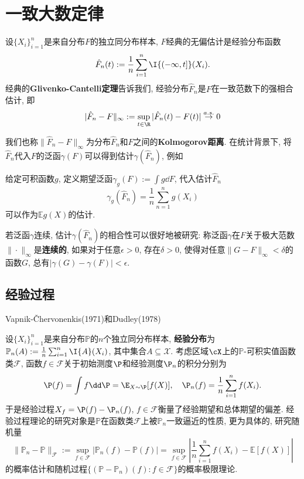 \section{一致大数定律}
 
设$\{X_i\}_{i=1}^n$是来自分布$F$的独立同分布样本, $F$经典的无偏估计是经验分布函数
\begin{equation*}
	\hat F_n(t) := \frac{1}{n} \sum_{i=1}^n \I{(-\infty, t]}(X_i). 
\end{equation*}
经典的\textbf{Glivenko-Cantelli定理}告诉我们, 经验分布$\hat F_n$是$F$在一致范数下的强相合估计, 即
\begin{equation*}
	|\hat F_n - F\|_{\infty} 
	:= \sup_{t \in \R} |\hat F_n(t) - F(t)| \stackrel{a.s.}{\to} 0
\end{equation*}

我们也称$\|\hat F_n - F\|_{\infty}$为分布$\hat F_n$和$F$之间的\textbf{Kolmogorov距离}. 
在统计背景下,  将$\hat F_n$代入$F$的泛函$\gamma(F)$可以得到估计$\gamma(\hat F_n)$, 例如

\begin{example}
	给定可积函数$g$, 定义期望泛函$\gamma_g(F) := \int g \dd F$, 代入估计$\hat F_n$
	\begin{equation*}
		\gamma_g(\hat F_n) = \frac{1}{n} \sum_{n=1}^n g(X_i)
	\end{equation*}
	可以作为$\mathbb{E} g(X)$的估计. 
\end{example}

若泛函$\gamma$连续, 估计$\gamma(\hat F_n)$的相合性可以很好地被研究: 称泛函$\gamma$在$F$关于极大范数$\| \cdot \|_{\infty}$是\textbf{连续的}, 如果对于任意$\epsilon > 0$, 存在$\delta > 0$, 使得对任意$\|G - F\|_{\infty} < \delta$的函数$G$, 总有$|\gamma(G) - \gamma(F)| < \epsilon$. 


\subsection{经验过程}

Vapnik-Čhervonenkis(1971)和Dudley(1978)

设$\{X_i\}_{i=1}^n$是来自分布$\mathbb{P}$的$n$个独立同分布样本, \textbf{经验分布}为$\mathbb{P}_n(A) := \frac{1}{n} \sum_{i=1}^n \I{A}(X_i)$, 其中集合$A \subseteq \mathcal{X}$. 
考虑区域$\cX$上的$\mathbb{P}$-可积实值函数类$\mathscr{F}$, 函数$f \in \mathscr{F}$关于初始测度$\P$和经验测度$\P_n$的积分分别为 
\begin{equation*}
	\P(f) = \int f \dd \P = \E_{X \sim \P} [f(X)], \quad
	\P_n(f) = \frac{1}{n} \sum_{i=1}^n f(X_i). 
\end{equation*}
于是经验过程$X_f = \P(f) - \P_n(f)$, $f \in \mathscr{F}$衡量了经验期望和总体期望的偏差. 
经验过程理论的研究对象是$\mathbb{P}$在函数类$\mathscr{F}$上被$\mathbb{P}_n$一致逼近的性质, 更为具体的, 研究随机量 
\begin{equation*}
	\|\mathbb{P}_n - \mathbb{P}\|_{\mathscr{F}} 
	:= \sup_{f \in\mathscr{F}} \left| \mathbb{P}_n(f) - \mathbb{P}(f) \right|
	= \sup_{f \in\mathscr{F}} \left| \frac{1}{n} \sum_{i=1}^n f(X_i) - \mathbb{E}[f(X)] \right|
\end{equation*}
的概率估计和随机过程$\{(\mathbb{P} - \mathbb{P}_n)(f) \colon f \in \mathscr{F}\}$的概率极限理论. 

